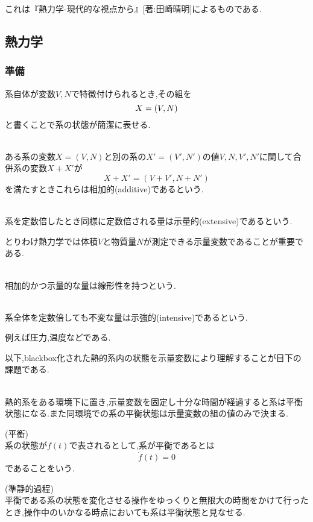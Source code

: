 \documentclass[dvipdfmx,uplatex]{jsarticle}
\begin{document}
これは『熱力学-現代的な視点から』[著:田崎晴明]によるものである.
\subsection{熱力学}
\subsubsection{準備}
系自体が変数$V,N$で特徴付けられるとき,その組を
\[
X = (V,N) \\
\]
と書くことで系の状態が簡潔に表せる.
\begin{defi} \mbox{} \\
ある系の変数$X = (V,N)$と別の系の$X' = (V',N')$の値$V,N,V',N'$に関して合併系の変数$X+X'$が
\[
X + X' = (V+V', N+N') 
\]
を満たすときこれらは相加的(additive)であるという.
\end{defi}

\begin{defi} \mbox{} \\
系を定数倍したとき同様に定数倍される量は示量的(extensive)であるという.
\end{defi}
とりわけ熱力学では体積$V$と物質量$N$が測定できる示量変数であることが重要である.
\begin{cf} \mbox{} \\
相加的かつ示量的な量は線形性を持つという.
\end{cf}
\begin{defi} \mbox{} \\
系全体を定数倍しても不変な量は示強的(intensive)であるという.
\end{defi}
例えば圧力,温度などである.


以下,blackbox化された熱的系内の状態を示量変数により理解することが目下の課題である.

\begin{law} \mbox{} \\
熱的系をある環境下に置き,示量変数を固定し十分な時間が経過すると系は平衡状態になる.また同環境での系の平衡状態は示量変数の組の値のみで決まる.
\end{law}
\begin{defi} (平衡) \\
系の状態が$f(t)$で表されるとして,系が平衡であるとは \\
\[
\dot{f}(t) = 0
\]
であることをいう.
\end{defi}

\begin{theo} (準静的過程)\\
平衡である系の状態を変化させる操作をゆっくりと無限大の時間をかけて行ったとき,操作中のいかなる時点においても系は平衡状態と見なせる.
\end{theo}
\end{document}
